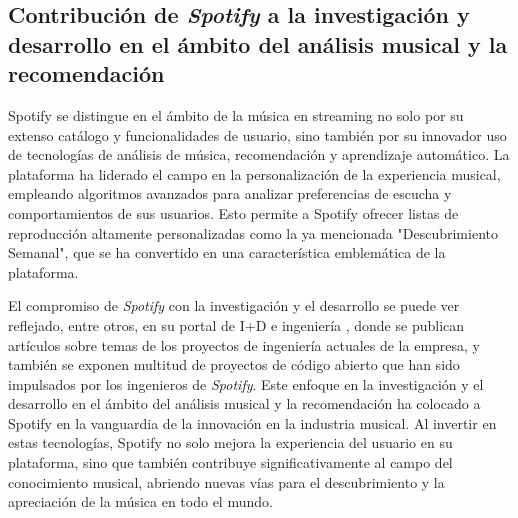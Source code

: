 \subsection{Contribución de \textit{Spotify} a la investigación y desarrollo en el ámbito del análisis musical y la recomendación\label{SEC:CONTRIBUCION_SPOTIFY}}

Spotify se distingue en el ámbito de la música en streaming no solo por su extenso catálogo y funcionalidades de usuario, sino también por su innovador uso 
de tecnologías de análisis de música, recomendación y aprendizaje automático. La plataforma ha liderado el campo en la personalización de la experiencia 
musical, empleando algoritmos avanzados para analizar preferencias de escucha y comportamientos de sus usuarios. Esto permite a Spotify ofrecer listas de 
reproducción altamente personalizadas como la ya mencionada "Descubrimiento Semanal", que se ha convertido en una característica emblemática de la plataforma.

El compromiso de \textit{Spotify} con la investigación y el desarrollo se puede ver reflejado, entre otros, en su portal de I+D e ingeniería
\cite{SpotifyEngineeringBlog}, donde se publican artículos sobre temas de los proyectos de ingeniería actuales de la empresa, y también se exponen 
multitud de proyectos de código abierto que han sido impulsados por los ingenieros de \textit{Spotify}. Este enfoque en la investigación y el desarrollo 
en el ámbito del análisis musical y la recomendación ha colocado a Spotify en la vanguardia de la innovación en la industria musical. Al invertir en estas 
tecnologías, Spotify no solo mejora la experiencia del usuario en su plataforma, sino que también contribuye significativamente al campo del conocimiento 
musical, abriendo nuevas vías para el descubrimiento y la apreciación de la música en todo el mundo.



